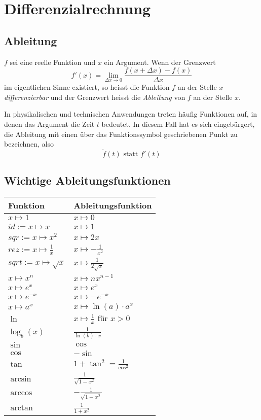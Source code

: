 \section{Differenzialrechnung}

\subsection{Ableitung}

$f$ sei eine reelle Funktion und $x$ ein Argument. Wenn der Grenzwert
%
\begin{displaymath}
f'(x) = \lim_{\Delta x \to 0}\frac{f(x + \Delta x) - f(x)}{\Delta x}
\end{displaymath}
%
im eigentlichen Sinne existiert, so heisst die Funktion $f$ an der Stelle $x$
\textit{differenzierbar} und der Grenzwert heisst die \textit{Ableitung} von $f$ an der Stelle $x$.

In physikalischen und technischen Anwendungen treten häufig Funktionen auf, in denen das Argument
die Zeit $t$ bedeutet. In diesem Fall hat es sich eingebürgert, die Ableitung mit einen über das
Funktionssymbol geschriebenen Punkt zu bezeichnen, also
%
\begin{displaymath}
	\dot{f}(t) \textrm{ statt } f'(t)
\end{displaymath}


\subsection{Wichtige Ableitungsfunktionen}

\renewcommand{\arraystretch}{1.8}
\begin{longtable}{ll}
\hline
\textbf{Funktion} & \textbf{Ableitungsfunktion} \\\hline\endhead
$x \mapsto 1$ & $x \mapsto 0$ \\
$id := x \mapsto x$ & $x \mapsto 1$ \\
$sqr := x \mapsto x^2$ & $x \mapsto 2x$ \\
$rez := x \mapsto \frac{1}{x}$ & $x \mapsto -\frac{1}{x^2}$ \\
$sqrt := x \mapsto \sqrt{x}$ & $x \mapsto \frac{1}{2\sqrt{x}}$ \\
$x \mapsto x^n$ & $x \mapsto nx^{n-1}$ \\
$x \mapsto e^x$ & $x \mapsto e^x$ \\
$x \mapsto e^{-x}$ & $x \mapsto -e^{-x}$ \\
$x \mapsto a^x$ & $x \mapsto \ln(a) \cdot a^x$ \\
$\ln$ & $x \mapsto \frac{1}{x} \textrm{ für } x > 0$ \\
$\log_b(x)$ & $\frac{1}{\ln(b) \cdot x}$ \\
$\sin$ & $\cos$ \\
$\cos$ & $-\sin$ \\
$\tan$ & $1 + \tan^2 = \frac{1}{\cos^2}$ \\
$\arcsin$ & $\frac{1}{\sqrt{1 - x^2}}$ \\
$\arccos$ & $-\frac{1}{\sqrt{1 - x^2}}$ \\
$\arctan$ & $\frac{1}{1 + x^2}$ \\
\end{longtable}


